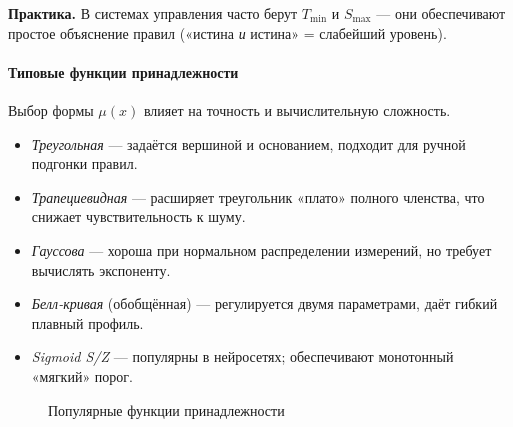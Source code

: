 \noindent
\textbf{Практика.}
В системах управления часто берут
$T_{\min}$ и $S_{\max}$ —
они обеспечивают простое объяснение правил
(«истина \emph{и} истина» = слабейший уровень).

\paragraph{Типовые функции принадлежности}

Выбор формы $\mu(x)$ влияет на точность и вычислительную сложность.

\begin{itemize}
  \item \emph{Треугольная} —
        задаётся вершиной и основанием,
        подходит для ручной подгонки правил.
  \item \emph{Трапециевидная} —
        расширяет треугольник «плато» полного членства,
        что снижает чувствительность к шуму.
  \item \emph{Гауссова} —
        хороша при нормальном распределении измерений,
        но требует вычислять экспоненту.
  \item \emph{Белл-кривая} (обобщённая) —
        регулируется двумя параметрами,
        даёт гибкий плавный профиль.
  \item \emph{Sigmoid S/Z} —
        популярны в нейросетях;
        обеспечивают монотонный «мягкий» порог.
\end{itemize}

\begin{figure}[h]
\centering
{}
\caption{Популярные функции принадлежности}
\label{fig:mpf}
\end{figure}

